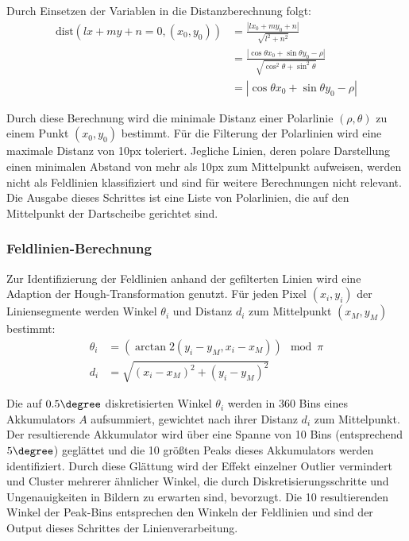 Durch Einsetzen der Variablen in die Distanzberechnung folgt:
\begin{align*}
    \text{dist}(lx + my + n = 0, (x_0, y_0)) & = \frac{| l x_0 + m y_0 + n|}{\sqrt{l^2+n^2}}                                                   \\
                                             & = \frac{| \cos{\theta} x_0 + \sin{\theta} y_0 - \rho |}{\sqrt{\cos^2{\theta} + \sin^2{\theta}}} \\
                                             & = | \cos{\theta} x_0 + \sin{\theta} y_0 - \rho |
\end{align*}

Durch diese Berechnung wird die minimale Distanz einer Polarlinie $(\rho, \theta)$ zu einem Punkt $(x_0, y_0)$ bestimmt. Für die Filterung der Polarlinien wird eine maximale Distanz von 10px toleriert. Jegliche Linien, deren polare Darstellung einen minimalen Abstand von mehr als 10px zum Mittelpunkt aufweisen, werden nicht als Feldlinien klassifiziert und sind für weitere Berechnungen nicht relevant. Die Ausgabe dieses Schrittes ist eine Liste von Polarlinien, die auf den Mittelpunkt der Dartscheibe gerichtet sind.

\subsubsection{Feldlinien-Berechnung}
\label{sec:impl:cv:lines:fields}

Zur Identifizierung der Feldlinien anhand der gefilterten Linien wird eine Adaption der Hough-Transformation genutzt. Für jeden Pixel $(x_i, y_i)$ der Liniensegmente werden Winkel $\theta_i$ und Distanz $d_i$ zum Mittelpunkt $(x_M, y_M)$ bestimmt:
\begin{align*}
    \theta_i & =(\arctan2{(y_i - y_M, x_i - x_M)}) \mod \pi \\
    d_i      & =\sqrt{(x_i - x_M)^2+(y_i - y_M)^2}
\end{align*}

Die auf $0.5\degree$ diskretisierten Winkel $\theta_i$ werden in 360 Bins eines Akkumulators $A$ aufsummiert, gewichtet nach ihrer Distanz $d_i$ zum Mittelpunkt. Der resultierende Akkumulator wird über eine Spanne von 10 Bins (entsprechend $5\degree$) geglättet und die 10 größten Peaks dieses Akkumulators werden identifiziert. Durch diese Glättung wird der Effekt einzelner Outlier vermindert und Cluster mehrerer ähnlicher Winkel, die durch Diskretisierungsschritte und Ungenauigkeiten in Bildern zu erwarten sind, bevorzugt. Die 10 resultierenden Winkel der Peak-Bins entsprechen den Winkeln der Feldlinien und sind der Output dieses Schrittes der Linienverarbeitung.

